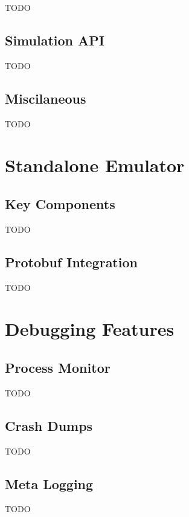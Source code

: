 TODO

\subsection{Simulation API}

TODO

\subsection{Miscilaneous}

TODO


\section{Standalone Emulator}

\subsection{Key Components}

TODO

\subsection{Protobuf Integration}

TODO


\section{Debugging Features}

\subsection{Process Monitor}

TODO

\subsection{Crash Dumps}

TODO

\subsection{Meta Logging}

TODO
